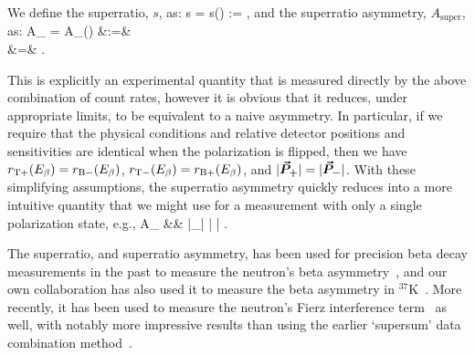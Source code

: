 We define the superratio, $s$, as:
\bea
s \;\;=\;\; s(\Ebeta) \;\;:=\;\;  , 
\eea
and the superratio asymmetry, $A_{\mathrm{super}}$, as:
\bea
A_{} \;\;=\;\; A_{}(\Ebeta) &:=&  
\\
&=& .
\eea
%

This is explicitly an experimental quantity that is measured directly by the above combination of count rates, however it is obvious that it reduces, under appropriate limits, to be equivalent to a naive asymmetry.  In particular, if we require that the physical conditions and relative detector positions and sensitivities are identical when the polarization is flipped, then we have $r_{\mathrm T+}(E_{\beta}) = r_{\mathrm B-}(E_{\beta})$, $r_{\mathrm T-}(E_{\beta}) = r_{\mathrm B+}(E_{\beta})$, and $|\bm{\vec{P}}_{\bm{+}}| = |\bm{\vec{P}}_{\bm{-}}|$.
%
With these simplifying assumptions, the superratio asymmetry quickly reduces into a more intuitive quantity that we might use for a measurement with only a single polarization state, e.g.,  
\bea
A_{} &\rightarrow&  
\;\;\; \xrightarrow[\bFierz = 0]{} \;\;\; \Abeta {} |\vecP_{\bm{+}}| \: \langle | \cos\theta | \rangle . 
\label{eq:singlepol_asymmetry}
\eea

The superratio, and superratio asymmetry, has been used for precision beta decay measurements in the past to measure the neutron's beta asymmetry~\cite{UCNA_first_superratio}, and our own collaboration has also used it to measure the beta asymmetry in $^{37}$K~\cite{ben_Abeta}.  More recently, it has been used to measure the neutron's Fierz interference term~\cite{UCNAfierz2020,Saul2020} as well, with notably more impressive results than using the earlier `supersum' data combination method~\cite{UCNA_first_Fierz}.  


